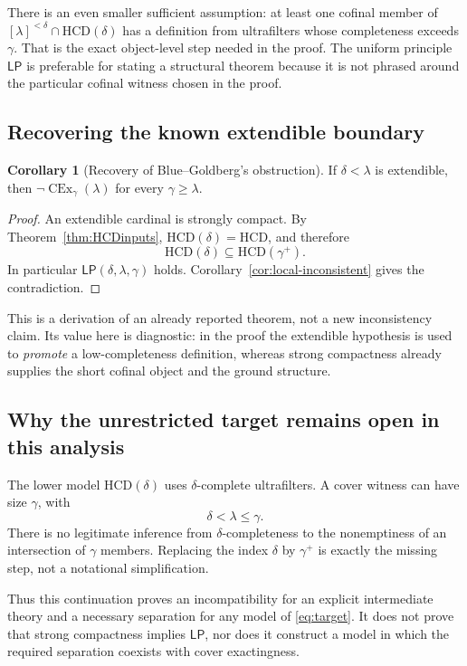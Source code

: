 \documentclass[11pt,letterpaper]{article}
\theoremstyle{definition}
\newtheorem{corollary}[definition]{Corollary}
\newcommand{\CEx}{\operatorname{CEx}}
\newcommand{\HCD}{\mathrm{HCD}}
\newcommand{\LP}{\mathsf{LP}}
\numberwithin{equation}{section}
\begin{document}
There is an even smaller sufficient assumption: at least one cofinal member of $[\lambda]^{<\delta}\cap\HCD(\delta)$ has a definition from ultrafilters whose completeness exceeds $\gamma$. That is the exact object-level step needed in the proof. The uniform principle $\LP$ is preferable for stating a structural theorem because it is not phrased around the particular cofinal witness chosen in the proof.

\subsection{Recovering the known extendible boundary}

\begin{corollary}[Recovery of Blue--Goldberg's obstruction]\label{cor:extendible}
If $\delta<\lambda$ is extendible, then $\neg\CEx_\gamma(\lambda)$ for every $\gamma\geq\lambda$.
\end{corollary}

\begin{proof}
An extendible cardinal is strongly compact. By Theorem~\ref{thm:HCDinputs}, $\HCD(\delta)=\HCD$, and therefore
\[
 \HCD(\delta)\subseteq\HCD(\gamma^+).
\]
In particular $\LP(\delta,\lambda,\gamma)$ holds. Corollary~\ref{cor:local-inconsistent} gives the contradiction.
\end{proof}

This is a derivation of an already reported theorem, not a new inconsistency claim. Its value here is diagnostic: in the proof the extendible hypothesis is used to \emph{promote} a low-completeness definition, whereas strong compactness already supplies the short cofinal object and the ground structure.

\subsection{Why the unrestricted target remains open in this analysis}

The lower model $\HCD(\delta)$ uses $\delta$-complete ultrafilters. A cover witness can have size $\gamma$, with
\[
 \delta<\lambda\leq\gamma.
\]
There is no legitimate inference from $\delta$-completeness to the nonemptiness of an intersection of $\gamma$ members. Replacing the index $\delta$ by $\gamma^+$ is exactly the missing step, not a notational simplification.

Thus this continuation proves an incompatibility for an explicit intermediate theory and a necessary separation for any model of \eqref{eq:target}. It does not prove that strong compactness implies $\LP$, nor does it construct a model in which the required separation coexists with cover exactingness.
\end{document}
